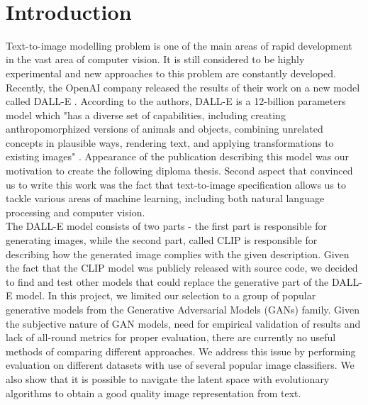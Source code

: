 \documentclass[11pt,a4paper,openany]{book}
\begin{document}
\thispagestyle{empty}

\thispagestyle{empty}
\newpage
$  $
\newpage
\pagestyle{empty}
{
  \renewcommand{\thispagestyle}[1]{}
  \tableofcontents
}
\clearpage
\pagestyle{plain}

\clearpage
{}
\chapter*{Introduction}

\noindent Text-to-image modelling problem is one of the main areas of rapid development in the vast area of computer vision.  It is still considered to be highly experimental and new approaches to this problem are constantly developed. Recently, the OpenAI company released the results of their work on a new model called DALL-E \cite{dalle}.  According to the authors,  DALL-E is a 12-billion parameters model which "has a diverse set of capabilities, including creating anthropomorphized versions of animals and objects, combining unrelated concepts in plausible ways, rendering text, and applying transformations to existing images" \cite{dalle-blog}.  Appearance of the publication describing this model was our motivation to create the following diploma thesis. Second aspect that convinced us to write this work was the fact that text-to-image specification allows us to tackle various areas of machine learning,  including both natural language processing and computer vision. \\
The DALL-E model consists of two parts - the first part is responsible for generating images, while the second part, called CLIP is responsible for describing how the generated image complies with the given description.  Given the fact that the CLIP model was publicly released with source code, we decided to find and test other models that could replace the generative part of the DALL-E model. In this project, we limited our selection to a group of popular generative models from the Generative Adversarial Models (GANs) family.  Given the subjective nature of GAN models, need for empirical validation of results and lack of all-round metrics for proper evaluation, there are currently no useful methods of comparing different approaches. We address this issue by performing evaluation on different datasets with use of several popular image classifiers. We also show that it is possible to navigate the latent space with evolutionary algorithms to obtain a good quality image representation from text.\\
\end{document}
